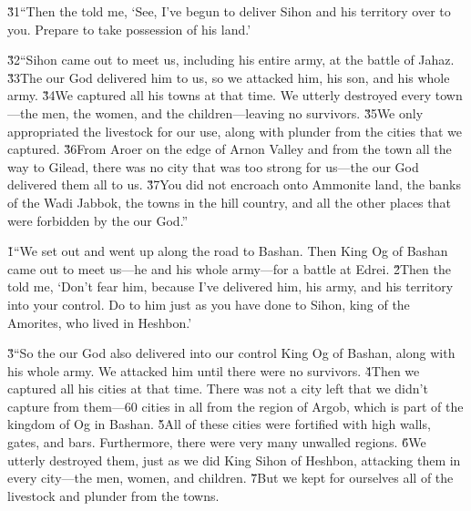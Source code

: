 \v{31}``Then the  told me, `See, I've begun to deliver Sihon and his territory over to you. Prepare to take possession of his land.'

\v{32}``Sihon came out to meet us, including his entire army, at the battle of Jahaz. \v{33}The  our God delivered him to us, so we attacked him, his son, and his whole army. \v{34}We captured all his towns at that time. We utterly destroyed every town---the men, the women, and the children---leaving no survivors. \v{35}We only appropriated the livestock for our use, along with plunder from the cities that we captured. \v{36}From Aroer on the edge of Arnon Valley and from the town all the way to Gilead, there was no city that was too strong for us---the  our God delivered them all to us. \v{37}You did not encroach onto Ammonite land, the banks of the Wadi Jabbok, the towns in the hill country, and all the other places that were forbidden by the  our God.''

\v{1}``We set out and went up along the road to Bashan. Then King Og of Bashan came out to meet us---he and his whole army---for a battle at Edrei. \v{2}Then the  told me, `Don't fear him, because I've delivered him, his army, and his territory into your control. Do to him just as you have done to Sihon, king of the Amorites, who lived in Heshbon.'

\v{3}``So the  our God also delivered into our control King Og of Bashan, along with his whole army. We attacked him until there were no survivors. \v{4}Then we captured all his cities at that time. There was not a city left that we didn't capture from them---60 cities in all from the region of Argob, which is part of the kingdom of Og in Bashan. \v{5}All of these cities were fortified with high walls, gates, and bars. Furthermore, there were very many unwalled regions. \v{6}We utterly destroyed them, just as we did King Sihon of Heshbon, attacking them in every city---the men, women, and children. \v{7}But we kept for ourselves all of the livestock and plunder from the towns.


